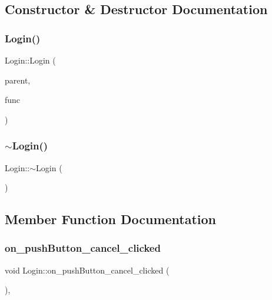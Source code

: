 \subsection{Constructor \& Destructor Documentation}
\mbox{\label{class_login_a6875606efe575cfe250d5780fb79c0f4}} 
\subsubsection{\texorpdfstring{Login()}{Login()}}
{\footnotesize\ttfamily Login\+::\+Login (\begin{DoxyParamCaption}\item[{\hyperlink{class_main_window}{Main\+Window} \&}]{parent,  }\item[{\hyperlink{class_login_a05d702e414775468b6dddb9f69f4663b}{function\+Name}}]{func }\end{DoxyParamCaption})\hspace{0.3cm}{\ttfamily [explicit]}}

\mbox{\label{class_login_a659bc7233ec12c79b9fa523c1734fbbc}} 
\subsubsection{\texorpdfstring{$\sim$\+Login()}{~Login()}}
{\footnotesize\ttfamily Login\+::$\sim$\+Login (\begin{DoxyParamCaption}{ }\end{DoxyParamCaption})}



\subsection{Member Function Documentation}
\mbox{\label{class_login_a4e3ad324e53e7f74de3470f3e5c492e4}} 
\subsubsection{\texorpdfstring{on\+\_\+push\+Button\+\_\+cancel\+\_\+clicked}{on\_pushButton\_cancel\_clicked}}
{\footnotesize\ttfamily void Login\+::on\+\_\+push\+Button\+\_\+cancel\+\_\+clicked (\begin{DoxyParamCaption}{ }\end{DoxyParamCaption})\hspace{0.3cm}{\ttfamily [private]}, {\ttfamily [slot]}}

